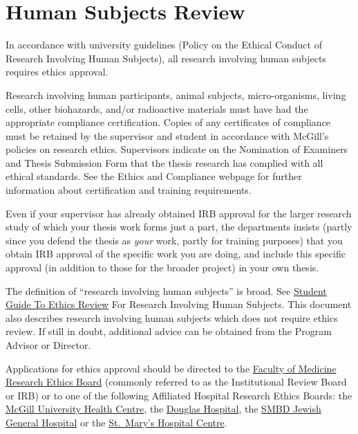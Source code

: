 \documentclass[
  openany]{book}
\begin{document}
\hypertarget{human-subjects-review}{%
\section{Human Subjects Review}\label{human-subjects-review}}

In accordance with university guidelines (Policy on the Ethical Conduct of Research Involving Human Subjects), all research involving human subjects requires ethics approval.

Research involving human participants, animal subjects, micro-organisms, living cells, other biohazards, and/or radioactive materials must have had the appropriate compliance certification. Copies of any certificates of compliance must be retained by the supervisor and student in accordance with McGill's policies on research ethics. Supervisors indicate on the Nomination of Examiners and Thesis Submission Form that the thesis research has complied with all ethical standards. See the Ethics and Compliance webpage for further information about certification and training requirements.

Even if your supervisor has already obtained IRB approval for the larger research study of which your thesis work forms just a part, the departments insists (partly since you defend the thesis as \emph{your} work, partly for training purposes) that you obtain IRB approval of the specific work you are doing, and include this specific approval (in addition to those for the broader project) in your own thesis.

The definition of ``research involving human subjects'' is broad. See \href{https://www.mcgill.ca/research/researchers/compliance/human}{Student Guide To Ethics Review} For Research Involving Human Subjects. This document also describes research involving human subjects which does not require ethics review. If still in doubt, additional advice can be obtained from the Program Advisor or Director.

Applications for ethics approval should be directed to the \href{https://www.mcgill.ca/medresearch/ethics}{Faculty of Medicine Research Ethics Board} (commonly referred to as the Institutional Review Board or IRB) or to one of the following Affiliated Hospital Research Ethics Boards: the \href{https://muhc.ca/cae/page/research-ethics}{McGill University Health Centre}, the \href{http://www.douglas.qc.ca/page/ethics}{Douglas Hospital}, the \href{http://www.jgh.ca/en/ResearchEthicsCommittee}{SMBD Jewish General Hospital} or the \href{http://www.stmarysresearch.ca/en/research_review/research-review}{St.~Mary's Hospital Centre}.
\end{document}
